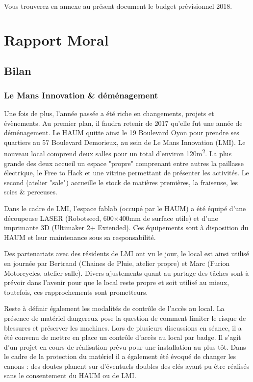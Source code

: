 \documentclass[11pt]{article}
\begin{document}
Vous trouverez en annexe au présent document le budget prévisionnel 2018.

\section{Rapport Moral}

\subsection{Bilan}

\subsubsection{Le Mans Innovation \& déménagement}
Une fois de plus, l'année passée a été riche en changements, projets et évènements. Au
premier plan, il faudra retenir de 2017 qu'elle fut une année de déménagement. Le HAUM
quitte ainsi le 19 Boulevard Oyon pour prendre ses quartiers au 57 Boulevard Demorieux, au
sein de Le Mans Innovation (LMI).
Le nouveau local comprend deux salles pour un total d'environ 120m\textsuperscript{2}. La
plus grande des deux accueil un espace "propre" comprenant entre autres la paillasse
électrique, le Free to Hack et une vitrine permettant de présenter les activités. Le
second (atelier "sale") accueille le stock de matières premières, la fraiseuse, les scies
\& perceuses.

Dans le cadre de LMI, l'espace fablab (occupé par le HAUM) a été équipé
d'une découpeuse LASER (Robotseed, 600$\times$400mm de surface utile) et d'une imprimante 3D
(Ultimaker 2+ Extended). Ces équipements sont à disposition du HAUM et leur maintenance
sous sa responsabilité.

Des partenariats avec des résidents de LMI ont vu le jour, le local est ainsi utilisé en
journée par Bertrand (Chaines de Pluie, atelier propre) et Marc (Furion Motorcycles,
atelier salle). Divers ajustements quant au partage des tâches sont à prévoir dans
l'avenir pour que le local reste propre et soit utilisé au mieux, toutefois, ces
rapprochements sont prometteurs.

Reste à définir également les modalités de contrôle de l'accès au local. La présence de
matériel dangereux pose la question de comment limiter le risque de blessures et préserver
les machines. Lors de plusieurs discussions en séance, il a été convenu de mettre en place
un contrôle d'accès au local par badge. Il s'agit d'un projet en cours de réalisation
prévu pour une installation au plus tôt. Dans le cadre de la protection du matériel il a
également été évoqué de changer les canons : des doutes planent sur d'éventuels doubles
des clés ayant pu être réalisés sans le consentement du HAUM ou de LMI.
\end{document}
